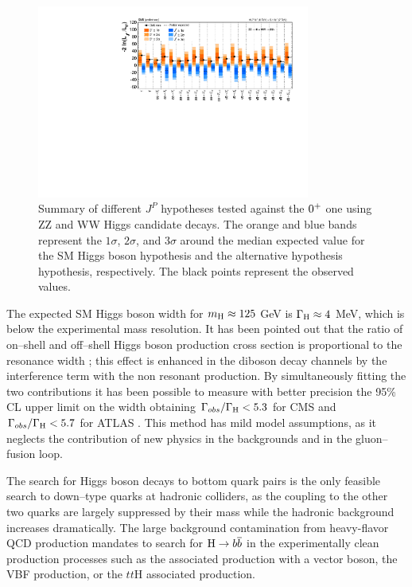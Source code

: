 \begin{figure}
        \centering
	\includegraphics[width=0.8\textwidth]{1_Introduction_Th_and_Exp/pics/hwwhzz_JP_SummaryPlot.pdf}
       \caption{Summary of different $J^P$ hypotheses tested against the $0^{+}$ one using ZZ and WW Higgs candidate decays. The orange and blue bands represent the $1\sigma$, $2\sigma$, and $3\sigma$ around the median expected value for the SM Higgs boson hypothesis and the alternative hypothesis hypothesis, respectively. The black points represent the observed values. }
       \label{fig:hjp}
\end{figure}

The expected SM Higgs boson width for $m_{\mathrm{H}} \approx 125$ GeV is $\Gamma_{\mathrm{H}} \approx 4$ MeV, which is below the experimental mass resolution. It has been pointed out that the ratio of on--shell and off--shell Higgs boson production cross section is proportional to the resonance width \cite{Caola:2013yja}; this effect is enhanced in the diboson decay channels by the interference term with the non resonant production. By simultaneously fitting the two contributions it has been possible to measure with better precision the 95\% CL upper limit on the width obtaining $\Gamma_{obs} / \Gamma_{\mathrm{H}} < 5.3$ for CMS \cite{Khachatryan:2014iha} and $\Gamma_{obs} / \Gamma_{\mathrm{H}} < 5.7$ for ATLAS \cite{ATLASCONF:2014042}. This method has mild model assumptions, as it neglects the contribution of new physics in the backgrounds and in the gluon--fusion loop. 

The search for Higgs boson decays to bottom quark pairs is the only feasible search to down--type quarks at hadronic colliders, as the coupling to the other two quarks are largely suppressed by their mass while the hadronic background increases dramatically. The large background contamination from heavy-flavor QCD production mandates to search for $\mathrm{H}\rightarrow b\overline{b}$ in the experimentally clean production processes such as the associated production with a vector boson, the VBF production, or the $tt$H associated production.

